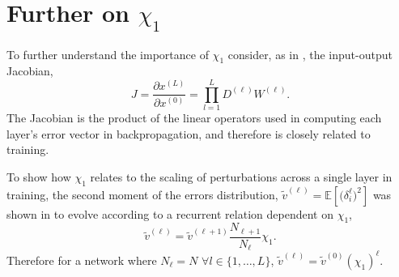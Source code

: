 \documentclass{article}
\theoremstyle{plain}
\theoremstyle{definition}
\theoremstyle{remark}
\begin{document}



\clearpage




\newpage
\appendix
\onecolumn

\section{\texorpdfstring{Further on $\chi_1$}{Further on chi1}}\label{app_further_on_chi}
To further understand the importance of $\chi_1$ consider, as in \cite{xiao_dynamical_2018}, the input-output Jacobian,
\begin{equation}
    J = \frac{\partial x^{(L)}}{\partial x^{(0)}} = \prod_{l=1}^L D^{(\ell)}W^{(\ell)}.
\end{equation}
The Jacobian is the product of the linear operators used in computing each layer's error vector in backpropagation, and therefore is closely related to training.

To show how $\chi_1$ relates to the scaling of perturbations across a single layer in training, the second moment of the errors distribution, $\tilde{v}^{(\ell)} = \mathbb{E} \left[ {({\delta}_i^{\ell}})^2 \right]$ was shown in \cite{schoenholz_deep_2017} to evolve according to a recurrent relation dependent on $\chi_1$, 
\begin{equation}
    \tilde{v}^{(\ell)} = \tilde{v}^{(\ell+1)} \frac{N_{\ell+1}}{N_{\ell}}\chi_1.
\end{equation}
Therefore for a network where $N_{\ell} = N$ $\forall l \in \{ 1, \dots, L\}$, $\tilde{v}^{(\ell)} = \tilde{v}^{(0)} \left( \chi_1\right)^{\ell}$. 
\end{document}
